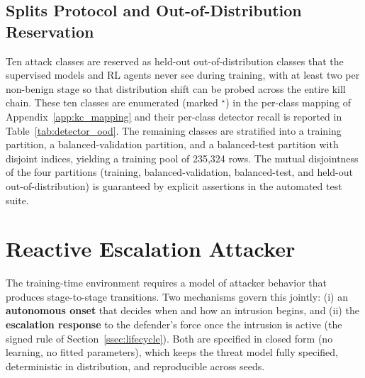 \subsection{Splits Protocol and Out-of-Distribution Reservation}\label{ssec:splits}
Ten attack classes are reserved as held-out out-of-distribution classes that the supervised models and RL agents never see during training, with at least two per non-benign stage so that distribution shift can be probed across the entire kill chain. These ten classes are enumerated (marked $^\star$) in the per-class mapping of Appendix~\ref{app:kc_mapping} and their per-class detector recall is reported in Table~\ref{tab:detector_ood}. The remaining classes are stratified into a training partition, a balanced-validation partition, and a balanced-test partition with disjoint indices, yielding a training pool of 235{,}324 rows. The mutual disjointness of the four partitions (training, balanced-validation, balanced-test, and held-out out-of-distribution) is guaranteed by explicit assertions in the automated test suite.


\section{Reactive Escalation Attacker}\label{sec:red_team}
The training-time environment requires a model of attacker behavior that produces stage-to-stage transitions. Two mechanisms govern this jointly: (i) an \textbf{autonomous onset} that decides when and how an intrusion begins, and (ii) the \textbf{escalation response} to the defender's force once the intrusion is active (the signed rule of Section~\ref{ssec:lifecycle}). Both are specified in closed form (no learning, no fitted parameters), which keeps the threat model fully specified, deterministic in distribution, and reproducible across seeds.

